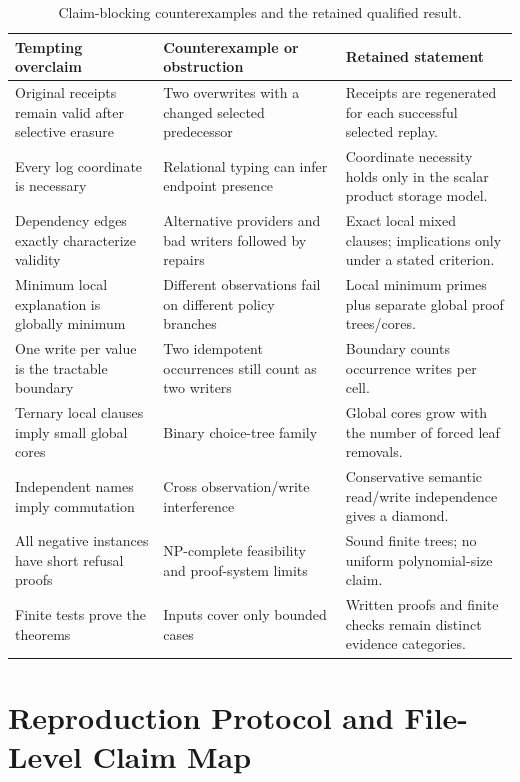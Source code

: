\begin{table}[t]
\caption{Claim-blocking counterexamples and the retained qualified result.}
\label{tab:falsification}
\small
\begin{tabularx}{\textwidth}{@{}p{}p{}X@{}}
\toprule
Tempting overclaim & Counterexample or obstruction & Retained statement \\
\midrule
Original receipts remain valid after selective erasure & Two overwrites with a changed selected predecessor & Receipts are regenerated for each successful selected replay. \\
Every log coordinate is necessary & Relational typing can infer endpoint presence & Coordinate necessity holds only in the scalar product storage model. \\
Dependency edges exactly characterize validity & Alternative providers and bad writers followed by repairs & Exact local mixed clauses; implications only under a stated criterion. \\
Minimum local explanation is globally minimum & Different observations fail on different policy branches & Local minimum primes plus separate global proof trees/cores. \\
One write per value is the tractable boundary & Two idempotent occurrences still count as two writers & Boundary counts occurrence writes per cell. \\
Ternary local clauses imply small global cores & Binary choice-tree family & Global cores grow with the number of forced leaf removals. \\
Independent names imply commutation & Cross observation/write interference & Conservative semantic read/write independence gives a diamond. \\
All negative instances have short refusal proofs & NP-complete feasibility and proof-system limits & Sound finite trees; no uniform polynomial-size claim. \\
Finite tests prove the theorems & Inputs cover only bounded cases & Written proofs and finite checks remain distinct evidence categories. \\
\bottomrule
\end{tabularx}
\end{table}

\section{Reproduction Protocol and File-Level Claim Map}
\label{app:protocol}

